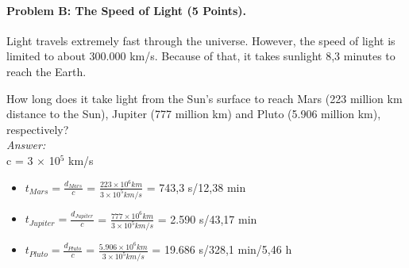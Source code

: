 \documentclass[12pt,times new roman, 2pt, a4paper]{report}
\begin{document}
\paragraph{Problem B: The Speed of Light (5 Points).}
Light travels extremely fast through the universe. However, the speed of light is limited to about 300.000 km/s. Because of that, it takes sunlight 8,3 minutes to reach the Earth.

How long does it take light from the Sun's surface to reach Mars (223 million km distance to the Sun), Jupiter (777 million km) and Pluto (5.906 million km), respectively?\\
\textit{Answer:}\\
c = 3 $\times$ 10$^{5}$ km/s\\
\begin{itemize}
	\item ${t}_{Mars} = \frac {d_{Mars}}{c}$ = $\frac{223\times 10^{6}km}{3\times 10^{5}km/s}$ = 743,3 s/12,38 min
	\item ${t}_{Jupiter} = \frac {d_{Jupiter}}{c}$ = $\frac{777\times 10^{6}km}{3\times 10^{5}km/s}$ = 2.590 s/43,17 min
	\item ${t}_{Pluto} = \frac {d_{Pluto}}{c}$ = $\frac{5.906\times 10^{6}km}{3\times 10^{5}km/s}$ = 19.686 s/328,1 min/5,46 h
\end{itemize}
\end{document}
